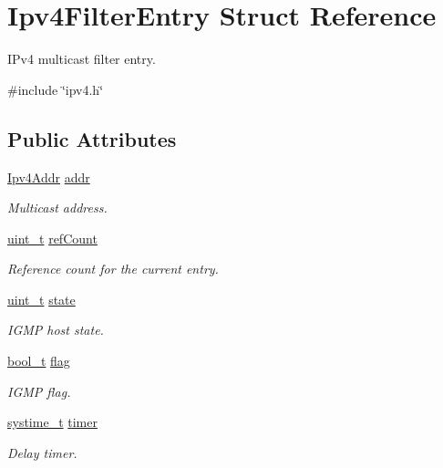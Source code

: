 \hypertarget{structIpv4FilterEntry}{}\section{Ipv4\+Filter\+Entry Struct Reference}
\label{structIpv4FilterEntry}


I\+Pv4 multicast filter entry.  




{\ttfamily \#include \char`\"{}ipv4.\+h\char`\"{}}

\subsection*{Public Attributes}
\begin{DoxyCompactItemize}
\item 
\hyperlink{ipv4_8h_a411debb3d770caa0c06d3f73367da37f}{Ipv4\+Addr} \hyperlink{structIpv4FilterEntry_a81c9fd6af892b3527845d3b39d3b256d}{addr}
\begin{DoxyCompactList}\small\item\em Multicast address. \end{DoxyCompactList}\item 
\hyperlink{compiler__port_8h_a12a1e9b3ce141648783a82445d02b58d}{uint\+\_\+t} \hyperlink{structIpv4FilterEntry_a6841595a84b65414b1b30aa0ef5ef1e6}{ref\+Count}
\begin{DoxyCompactList}\small\item\em Reference count for the current entry. \end{DoxyCompactList}\item 
\hyperlink{compiler__port_8h_a12a1e9b3ce141648783a82445d02b58d}{uint\+\_\+t} \hyperlink{structIpv4FilterEntry_abc0b2be8dd44f499324d119243959111}{state}
\begin{DoxyCompactList}\small\item\em I\+G\+MP host state. \end{DoxyCompactList}\item 
\hyperlink{compiler__port_8h_a812d16e5494522586b3784e55d479912}{bool\+\_\+t} \hyperlink{structIpv4FilterEntry_a3821e585190d92f01df1529e828c124f}{flag}
\begin{DoxyCompactList}\small\item\em I\+G\+MP flag. \end{DoxyCompactList}\item 
\hyperlink{compiler__port_8h_ae3e32a98d431a02106616da3071832dd}{systime\+\_\+t} \hyperlink{structIpv4FilterEntry_aaa44209273e6a296c3e63b789f7441d4}{timer}
\begin{DoxyCompactList}\small\item\em Delay timer. \end{DoxyCompactList}\end{DoxyCompactItemize}


